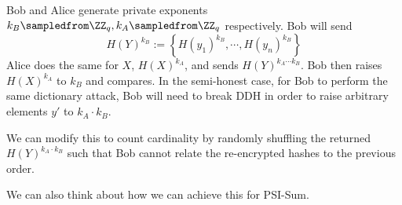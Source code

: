 Bob and Alice generate private exponents $k_B\sampledfrom \ZZ_q, k_A\sampledfrom \ZZ_q$ respectively. Bob will send
\[H(Y)^{k_B} := \left\{ H(y_1)^{k_B}, \cdots, H(y_n)^{k_B} \right\}\]
Alice does the same for $X$, $H(X)^{k_A}$, and sends $H(Y)^{k_A\cdots k_B}$. Bob then raises $H(X)^{k_A}$ to $k_B$ and compares. In the semi-honest case, for Bob to perform the same dictionary attack, Bob will need to break DDH in order to raise arbitrary elements $y'$ to $k_A\cdot k_B$.

We can modify this to count cardinality by randomly shuffling the returned $H(Y)^{k_A\cdot k_B}$ such that Bob cannot relate the re-encrypted hashes to the previous order.


We can also think about how we can achieve this for PSI-Sum.